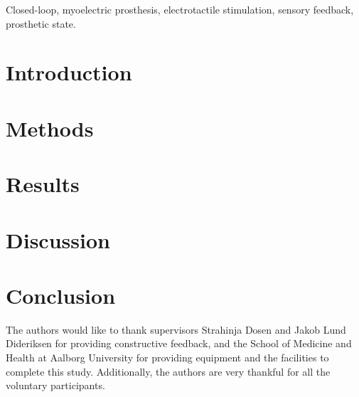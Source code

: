 \documentclass[journal]{IEEEtran}
\begin{document}
\begin{IEEEkeywords}
Closed-loop, myoelectric prosthesis, electrotactile stimulation, sensory feedback, prosthetic state. 
\end{IEEEkeywords}

\IEEEpeerreviewmaketitle

\section{Introduction}
 

\section{Methods}























\section{Results}



\section{Discussion}



\section{Conclusion}


\appendix[Acknowledgement]
The authors would like to thank supervisors Strahinja Dosen and Jakob Lund Dideriksen for providing constructive feedback, and the School of Medicine and Health at Aalborg University for providing equipment and the facilities to complete this study. Additionally, the authors are very thankful for all the voluntary participants. 


\end{document}
